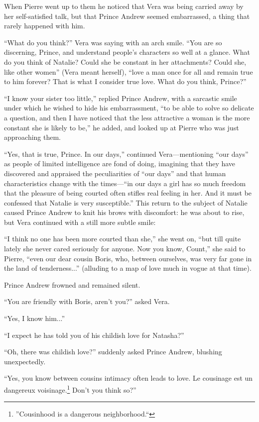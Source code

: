 When Pierre went up to them he noticed that Vera was being
carried away by her self-satisfied talk, but that Prince Andrew
seemed embarrassed, a thing that rarely happened with him.

``What do you think?'' Vera was saying with an arch smile. ``You
are so discerning, Prince, and understand people's characters so
well at a glance. What do you think of Natalie? Could she be
constant in her attachments? Could she, like other women'' (Vera
meant herself), ``love a man once for all and remain true to him
forever? That is what I consider true love. What do you think,
Prince?''

``I know your sister too little,'' replied Prince Andrew, with a
sarcastic smile under which he wished to hide his embarrassment,
``to be able to solve so delicate a question, and then I have
noticed that the less attractive a woman is the more constant she
is likely to be,'' he added, and looked up at Pierre who was just
approaching them.

``Yes, that is true, Prince. In our days,'' continued
Vera---mentioning ``our days'' as people of limited intelligence
are fond of doing, imagining that they have discovered and
appraised the peculiarities of ``our days'' and that human
characteristics change with the times---``in our days a girl has
so much freedom that the pleasure of being courted often stifles
real feeling in her. And it must be confessed that Natalie is
very susceptible.'' This return to the subject of Natalie caused
Prince Andrew to knit his brows with discomfort: he was about to
rise, but Vera continued with a still more subtle smile:

``I think no one has been more courted than she,'' she went on,
``but till quite lately she never cared seriously for anyone. Now
you know, Count,'' she said to Pierre, ``even our dear cousin
Boris, who, between ourselves, was very far gone in the land of
tenderness...'' (alluding to a map of love much in vogue at that
time).

Prince Andrew frowned and remained silent.

``You are friendly with Boris, aren't you?'' asked Vera.

``Yes, I know him...''

``I expect he has told you of his childish love for Natasha?''

``Oh, there was childish love?'' suddenly asked Prince Andrew,
blushing unexpectedly.

``Yes, you know between cousins intimacy often leads to love. Le
cousinage est un dangereux voisinage.\footnote{''Cousinhood is a
dangerous neighborhood.``} Don't you think so?''

